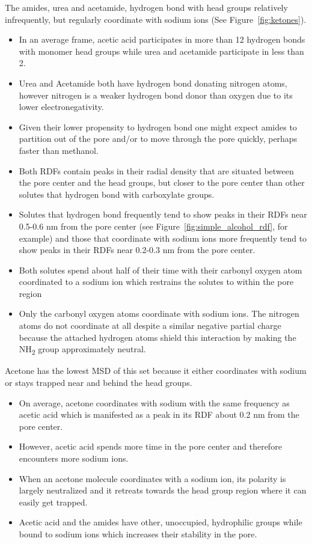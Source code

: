 \documentclass{article}
\begin{document}
  \noindent The amides, urea and acetamide, hydrogen bond with head groups relatively 
  infrequently, but regularly coordinate with sodium ions (See Figure~\ref{fig:ketones}).
  \begin{itemize}
    \item In an average frame, acetic acid participates in more than 12 hydrogen 
    bonds with monomer head groups while urea and acetamide participate in less than 2.
    \item Urea and Acetamide both have hydrogen bond donating nitrogen atoms, however
  	nitrogen is a weaker hydrogen bond donor than oxygen due to its lower electronegativity. %
  	\item Given their lower propensity to hydrogen bond one might expect amides to partition
  	out of the pore and/or to move through the pore quickly, perhaps faster than methanol.
    \item Both RDFs contain peaks in their radial density that are situated between the 
    pore center and the head groups, but closer to the pore center than other solutes that
    hydrogen bond with carboxylate groups.
    \item Solutes that hydrogen bond frequently tend to show peaks in their RDFs near 
    0.5-0.6 nm from the pore center (see Figure~\ref{fig:simple_alcohol_rdf}, for example) 
    and those that coordinate with sodium ions more frequently tend to show peaks in
    their RDFs near 0.2-0.3 nm from the pore center.
    \item Both solutes spend about half of their time with their carbonyl oxygen atom 
    coordinated to a sodium ion which restrains the solutes to within the pore region
    \item Only the carbonyl oxygen atoms coordinate with sodium ions. 
    The nitrogen atoms do not coordinate at all despite a similar negative partial
    charge because the attached hydrogen atoms shield this interaction by making the
    NH\textsubscript{2} group approximately neutral.
  \end{itemize}   

  \noindent Acetone has the lowest MSD of this set because it either coordinates with
  sodium or stays trapped near and behind the head groups.
  \begin{itemize}
    \item On average, acetone coordinates with sodium with the same frequency as acetic acid 
    which is manifested as a peak in its RDF about 0.2 nm from the pore center.
    \item However, acetic acid spends more time in the pore center and therefore encounters
    more sodium ions.
    \item When an acetone molecule coordinates with a sodium ion, its polarity is 
    largely neutralized and it retreats towards the head group region where it can easily
    get trapped.
    \item Acetic acid and the amides have other, unoccupied, hydrophilic groups while bound
    to sodium ions which increases their stability in the pore.
  \end{itemize}
  
\end{document}
